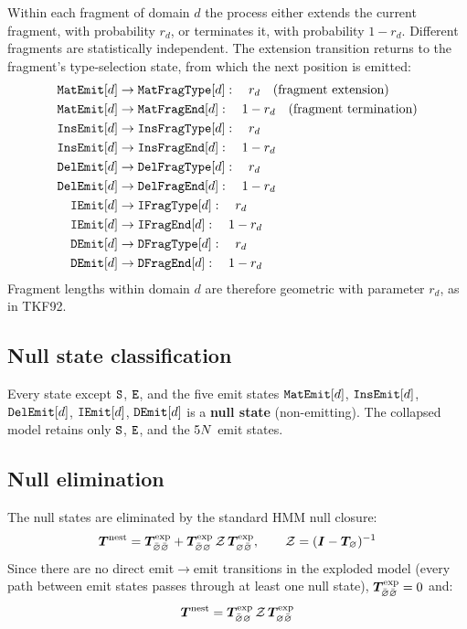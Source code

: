 \documentclass{article}
\newcommand{\ext}{r}
\newcommand{\Tnull}{\bm{T}_{\varnothing}}
\newcommand{\Zsum}{\mathcal{Z}}
\begin{document}
Within each fragment of domain $d$ the process either extends the current
fragment, with probability $\ext_d$, or terminates it, with probability
$1-\ext_d$. Different fragments are statistically independent. The
extension transition returns to the fragment's type-selection state, from
which the next position is emitted:
\begin{align}
\mkfragemit{d} &\to \mkfragtype{d}: \quad \ext_d \quad\text{(fragment extension)} \\
\mkfragemit{d} &\to \mkfragend{d}: \quad 1-\ext_d \quad\text{(fragment termination)} \\
\mkifragemit{d} &\to \mkifragtype{d}: \quad \ext_d  \\
\mkifragemit{d} &\to \mkifragend{d}: \quad 1-\ext_d  \\
\mkdfragemit{d} &\to \mkdfragtype{d}: \quad \ext_d  \\
\mkdfragemit{d} &\to \mkdfragend{d}: \quad 1-\ext_d  \\
\ikfragemit{d} &\to \ikfragtype{d}: \quad \ext_d  \\
\ikfragemit{d} &\to \ikfragend{d}: \quad 1-\ext_d  \\
\dkfragemit{d} &\to \dkfragtype{d}: \quad \ext_d  \\
\dkfragemit{d} &\to \dkfragend{d}: \quad 1-\ext_d
\end{align}
Fragment lengths within domain $d$ are therefore geometric with parameter
$\ext_d$, as in TKF92.

\subsection{Null state classification}

Every state except ${\tt S}$, ${\tt E}$, and the five emit states
$\mathtt{MatEmit}[d]$, $\mathtt{InsEmit}[d]$, $\mathtt{DelEmit}[d]$,
$\mathtt{IEmit}[d]$, $\mathtt{DEmit}[d]$ is a \textbf{null state}
(non-emitting). The collapsed model retains only ${\tt S}$, ${\tt E}$, and
the $5N$ emit states.

\subsection{Null elimination}

The null states are eliminated by the standard HMM null closure:
\[
\bm{T}^{\rm nest} = \bm{T}^{\rm exp}_{\bar\varnothing\bar\varnothing}
+ \bm{T}^{\rm exp}_{\bar\varnothing\varnothing}\,\Zsum\,\bm{T}^{\rm exp}_{\varnothing\bar\varnothing},\qquad \Zsum = (\bm{I}-\Tnull)^{-1}
\]
Since there are no direct emit$\to$emit transitions in the exploded model
(every path between emit states passes through at least one null state),
$\bm{T}^{\rm exp}_{\bar\varnothing\bar\varnothing} = 0$ and:
\[
\bm{T}^{\rm nest} = \bm{T}^{\rm exp}_{\bar\varnothing\varnothing}\,\Zsum\,\bm{T}^{\rm exp}_{\varnothing\bar\varnothing}
\]
\end{document}
